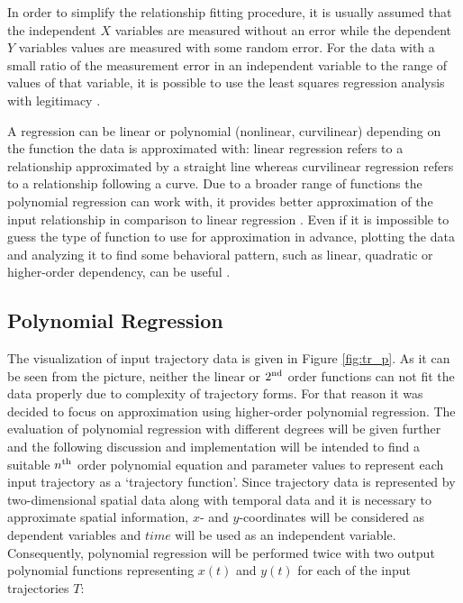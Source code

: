 In order to simplify the relationship fitting procedure, it is usually assumed that the independent $X$ variables are measured without an error while the dependent $Y$ variables values are measured with some random error. For the data with a small ratio of the measurement error in an independent variable to the range of values of that variable, it is possible to use the least squares regression analysis with legitimacy \cite{article:behav_form_extr}.

A regression can be linear or polynomial (nonlinear, curvilinear) depending on the function the data is approximated with: linear regression refers to a relationship approximated by a straight line whereas curvilinear regression refers to a relationship following a curve. Due to a broader range of functions the polynomial regression can work with, it provides better approximation of the input relationship in comparison to linear regression \cite{online:intro_lr_pr}. Even if it is impossible to guess the type of function to use for approximation in advance, plotting the data and analyzing it to find some behavioral pattern, such as linear, quadratic or higher-order dependency, can be useful \cite{article:behav_form_extr}. 

\subsection{Polynomial Regression}

The visualization of input trajectory data is given in Figure \ref{fig:tr_p}. As it can be seen from the picture, neither the linear or $2\textsuperscript{nd}$ order functions can not fit the data properly due to complexity of trajectory forms. For that reason it was decided to focus on approximation using higher-order polynomial regression. The evaluation of polynomial regression with different degrees will be given further and the following discussion and implementation will be intended to find a suitable $n\textsuperscript{th}$ order polynomial equation and parameter values to represent each input trajectory as a `trajectory function'. Since trajectory data is represented by two-dimensional spatial data along with temporal data and it is necessary to approximate spatial information, $x$- and $y$-coordinates will be considered as dependent variables and $time$ will be used as an independent variable. Consequently, polynomial regression will be performed twice with two output polynomial functions representing $x(t)$ and $y(t)$ for each of the input trajectories $T$:

